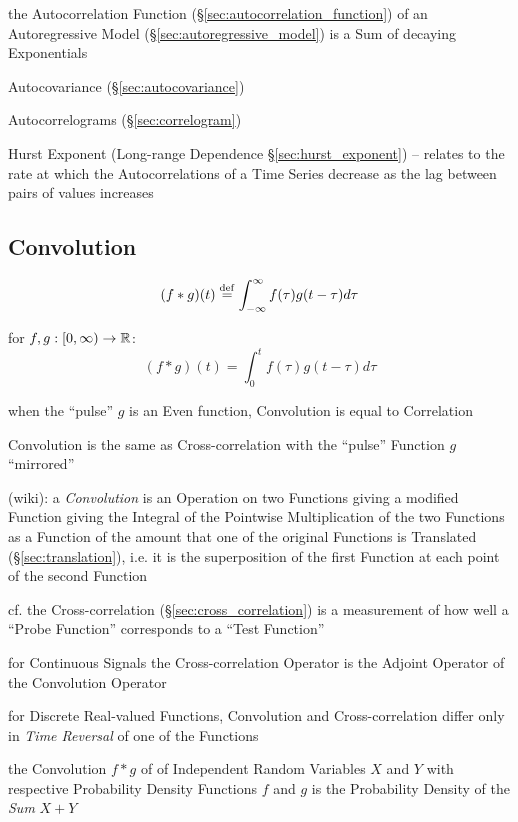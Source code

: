 \fist the Autocorrelation Function (\S\ref{sec:autocorrelation_function}) of an
Autoregressive Model (\S\ref{sec:autoregressive_model}) is a Sum of decaying
Exponentials

\fist Autocovariance (\S\ref{sec:autocovariance})

Autocorrelograms (\S\ref{sec:correlogram})

Hurst Exponent (Long-range Dependence \S\ref{sec:hurst_exponent}) -- relates to
the rate at which the Autocorrelations of a Time Series decrease as the lag
between pairs of values increases



\subsection{Convolution}\label{sec:convolution}

\[
  (f * g)(t) \stackrel{\mathrm{def}}= \int_{-\infty}^\infty f(\tau) g(t - \tau) d\tau
\]

for $f, g : [0, \infty) \to \mathbb{R}$:
\[
  (f * g)(t) = \int_0^t f(\tau) g(t - \tau) d\tau
\]

when the ``pulse'' $g$ is an Even function, Convolution is equal to Correlation

Convolution is the same as Cross-correlation with the ``pulse'' Function $g$
``mirrored''


(wiki): a \emph{Convolution} is an Operation on two Functions giving a modified
Function giving the Integral of the Pointwise Multiplication of the two
Functions as a Function of the amount that one of the original Functions is
Translated (\S\ref{sec:translation}), i.e. it is the superposition of the first
Function at each point of the second Function

cf. the Cross-correlation (\S\ref{sec:cross_correlation}) is a measurement of
how well a ``Probe Function'' corresponds to a ``Test Function''

for Continuous Signals the Cross-correlation Operator is the Adjoint Operator of
the Convolution Operator

for Discrete Real-valued Functions, Convolution and Cross-correlation differ
only in \emph{Time Reversal} of one of the Functions

the Convolution $f * g$ of of Independent Random Variables $X$ and $Y$ with
respective Probability Density Functions $f$ and $g$ is the Probability Density
of the \emph{Sum} $X + Y$

